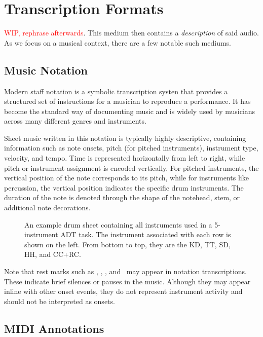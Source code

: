 \section{Transcription Formats}

\textcolor{red}{WIP, rephrase afterwards}.
This medium then contains a \textit{description} of said audio. As we focus on a musical context, there are a few notable such mediums.

\subsection{Music Notation}

Modern staff notation is a symbolic transcription systen that provides a structured set of instructions for a musician to reproduce a performance. It has become the standard way of documenting music and is widely used by musicians across many different genres and instruments.

Sheet music written in this notation is typically highly descriptive, containing information such as note onsets, pitch (for pitched instruments), instrument type, velocity, and tempo. Time is represented horizontally from left to right, while pitch or instrument assignment is encoded vertically. For pitched instruments, the vertical position of the note corresponds to its pitch, while for instruments like percussion, the vertical position indicates the specific drum instruments. The duration of the note is denoted through the shape of the notehead, stem, or additional note decorations.

\begin{figure}[H]
    \centering
    
    \caption{An example drum sheet containing all instruments used in a 5-instrument \gls{ADT} task. The instrument associated with each row is shown on the left. From bottom to top, they are the \acrfull{KD}, \acrfull{TT}, \acrfull{SD}, \acrfull{HH}, and \acrfull{CC+RC}.}
    \label{DrumsheetFigure}
\end{figure}

Note that rest marks such as \HaPa, \ViPa, \AcPa, and \SePa ~may appear in notation transcriptions. These indicate brief silences or pauses in the music. Although they may appear inline with other onset events, they do not represent instrument activity and should not be interpreted as onsets.

\subsection{MIDI Annotations}

